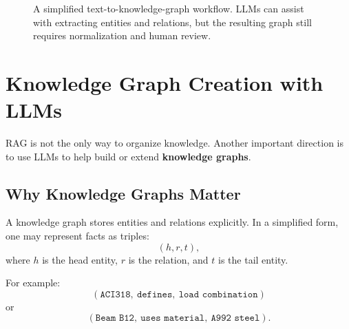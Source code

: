 \documentclass[12pt]{article}
\begin{document}
\begin{figure}[ht]
    \centering
    \caption{A simplified text-to-knowledge-graph workflow. LLMs can assist with extracting entities and relations, but the resulting graph still requires normalization and human review.}
    \label{t16fig:kg_pipeline}
\end{figure}

\section{Knowledge Graph Creation with LLMs}

RAG is not the only way to organize knowledge. Another important direction is to use LLMs to help build or extend \textbf{knowledge graphs}.

\subsection{Why Knowledge Graphs Matter}

A knowledge graph stores entities and relations explicitly. In a simplified form, one may represent facts as triples:
\begin{equation}
    (h,r,t),
    \label{t16eq:triple}
\end{equation}
where $h$ is the head entity, $r$ is the relation, and $t$ is the tail entity.

For example:
\[
    (\texttt{ACI318},\ \texttt{defines},\ \texttt{load\ combination})
\]
or
\[
    (\texttt{Beam\ B12},\ \texttt{uses\ material},\ \texttt{A992\ steel}).
\]
\end{document}
